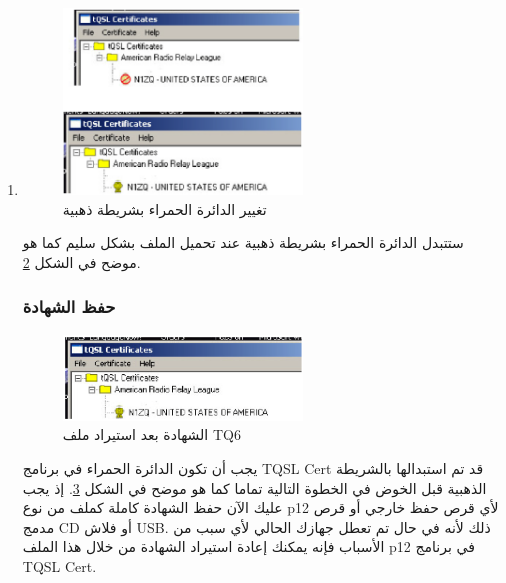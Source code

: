 \documentclass[a4paper,12pt]{article}
\begin{document}
\begin{enumerate}
\begin{figure}[!hbtp]
		\caption{اختر الملف الصحيح لتحميله في البرنامج}
		\label{fig:SelectTQ6File}
		\end{figure}
			  اختر ملف الـ \textenglish{TQ6} والذي قمت بحفظه من مُرفقات البريد الإلكتروني كما هو موضح في الشكل \ref{fig:SelectTQ6File}.
\clearpage
		\item
		\begin{figure}[!hbtp]
		\centering
		\includegraphics[width=0.6\textwidth]{unsignedsigned.eps}
		\caption{تغيير الدائرة الحمراء بشريطة ذهبية}
		\label{fig:UnSignedSigned}
		\end{figure}
			  ستتبدل الدائرة الحمراء بشريطة ذهبية عند تحميل الملف بشكل سليم كما هو موضح في الشكل \ref{fig:UnSignedSigned}.

\vspace{18pt}
\begin{center}
	\color{slategray2}
{\Huge \decoone}
\end{center}

\subsubsection{حفظ الشهادة}
		\begin{figure}[!hbtp]
		\centering
		\includegraphics[width=0.6\textwidth]{signed.eps}
		\caption{الشهادة بعد استيراد ملف \textenglish{TQ6}}
		\label{fig:SignedTQ6}
		\end{figure}
يجب أن تكون الدائرة الحمراء في برنامج \textenglish{TQSL Cert} قد تم استبدالها بالشريطة
الذهبية قبل الخوض في الخطوة التالية تماما كما هو موضح في الشكل \ref{fig:SignedTQ6}. إذ يجب عليك الآن حفظ الشهادة كاملة
كملف من نوع \textenglish{p12} لأي قرص حفظ خارجي أو قرص مدمج \textenglish{CD} أو فلاش \textenglish{USB}. ذلك لأنه
في حال تم تعطل جهازك الحالي لأي سبب من الأسباب فإنه يمكنك إعادة استيراد
الشهادة من خلال هذا الملف \textenglish{p12} في برنامج \textenglish{TQSL Cert}.


\end{enumerate}
\end{document}
